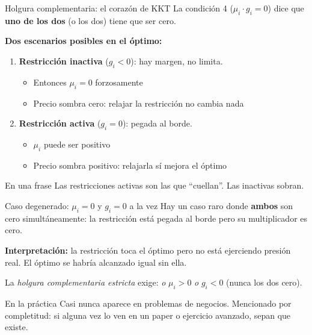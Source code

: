 \documentclass{beamer}
\begin{document}
\begin{frame}{Holgura complementaria: el corazón de KKT}
    \small
    La condición 4 ($\mu_i \cdot g_i = 0$) dice que \textbf{uno de los dos} (o los dos) tiene que ser cero.

    \vspace{0.5em}

    \textbf{Dos escenarios posibles en el óptimo:}

    \begin{enumerate}
        \item \textbf{Restricción inactiva} ($g_i < 0$): hay margen, no limita.
        \begin{itemize}
            \item Entonces $\mu_i = 0$ forzosamente
            \item Precio sombra cero: relajar la restricción no cambia nada
        \end{itemize}
        \item \textbf{Restricción activa} ($g_i = 0$): pegada al borde.
        \begin{itemize}
            \item $\mu_i$ puede ser positivo
            \item Precio sombra positivo: relajarla sí mejora el óptimo
        \end{itemize}
    \end{enumerate}

    \vspace{0.5em}

    \begin{alertblock}{En una frase}
        Las restricciones activas son las que ``cuellan''. Las inactivas sobran.
    \end{alertblock}
\end{frame}

\begin{frame}{Caso degenerado: $\mu_i = 0$ y $g_i = 0$ a la vez}
    \small
    Hay un caso raro donde \textbf{ambos} son cero simultáneamente: la restricción está pegada al borde pero su multiplicador es cero.

    \vspace{0.5em}

    \textbf{Interpretación:} la restricción toca el óptimo pero no está ejerciendo presión real. El óptimo se habría alcanzado igual sin ella.

    \vspace{0.5em}

    La \textit{holgura complementaria estricta} exige: \textit{o} $\mu_i > 0$ \textit{o} $g_i < 0$ (nunca los dos cero).

    \vspace{0.5em}

    \begin{alertblock}{En la práctica}
        Casi nunca aparece en problemas de negocios. Mencionado por completitud: si alguna vez lo ven en un paper o ejercicio avanzado, sepan que existe.
    \end{alertblock}
\end{frame}
\end{document}
